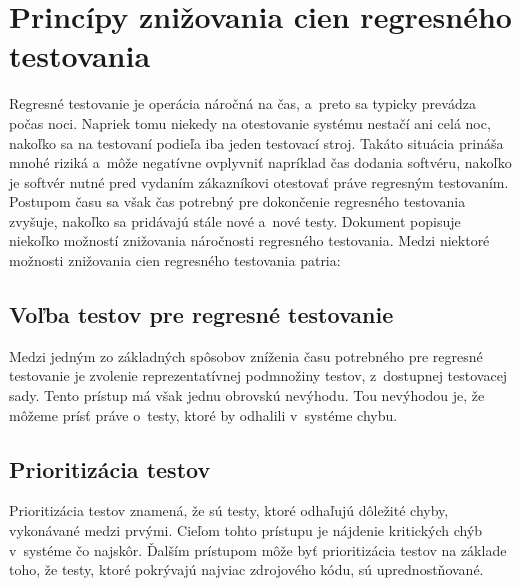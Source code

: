 \section{Princípy znižovania cien regresného testovania}
\label{sekcia:principy_znizovania_cien}
Regresné testovanie je operácia náročná na čas, a~preto sa typicky 
prevádza počas noci. Napriek tomu niekedy na otestovanie systému 
nestačí ani celá noc, nakoľko sa na testovaní podieľa iba jeden testovací 
stroj. Takáto situácia prináša mnohé riziká a~môže negatívne ovplyvniť 
napríklad čas dodania softvéru, nakoľko je softvér nutné pred vydaním 
zákazníkovi otestovať práve regresným testovaním. Postupom času sa však 
čas potrebný pre dokončenie regresného testovania zvyšuje, nakoľko sa 
pridávajú stále nové a~nové testy. Dokument \cite{Parallel_approach} 
popisuje niekoľko možností znižovania náročnosti regresného testovania.
Medzi niektoré možnosti znižovania cien regresného testovania patria:

\subsection*{Voľba testov pre regresné testovanie}
Medzi jedným zo základných spôsobov zníženia času potrebného pre 
regresné testovanie je zvolenie reprezentatívnej podmnožiny testov,
z~dostupnej testovacej sady. Tento prístup má však jednu obrovskú nevýhodu. 
Tou nevýhodou je, že môžeme prísť práve o~testy, ktoré by odhalili 
v~systéme chybu. 

\subsection*{Prioritizácia testov}
Prioritizácia testov znamená, že sú testy, ktoré odhaľujú dôležité chyby, 
vykonávané medzi prvými. Cieľom tohto prístupu je nájdenie kritických 
chýb v~systéme čo najskôr. Ďalším prístupom môže byť prioritizácia testov 
na základe toho, že testy, ktoré pokrývajú najviac zdrojového kódu,
sú uprednostňované.

